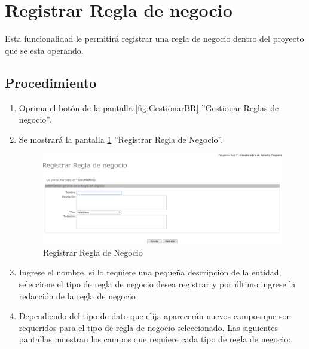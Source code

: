 
\hypertarget{cv:registrarBR}{\section{Registrar Regla de negocio}} \label{sec:registrarBR}

	Esta funcionalidad le permitirá registrar una regla de negocio dentro del proyecto que se esta operando. 

		\subsection{Procedimiento}

			\begin{enumerate}
	
			\item Oprima el botón \IURegistrar{} de la pantalla \ref{fig:GestionarBR} ''Gestionar Reglas de negocio''.
			
			\item Se mostrará la pantalla \ref{fig:registrarBR} ''Registrar Regla de Negocio''.

			\begin{figure}[H]
				\begin{center}
					\includegraphics[scale=0.5]{roles/lider/reglasNegocio/pantallas/IU8-1registrarBR}
					\caption{Registrar Regla de Negocio}
					\label{fig:registrarBR}
				\end{center}
			\end{figure}
		
			\item Ingrese el nombre, si lo requiere una pequeña descripción de la entidad, seleccione el tipo de regla de negocio desea registrar y por último ingrese la redacción de la regla de negocio
			
			\item Dependiendo del tipo de dato que elija aparecerán nuevos campos que son requeridos para el tipo de regla de negocio seleccionado. Las siguientes pantallas muestran los campos que requiere cada tipo de regla de negocio: 
			

\end{enumerate}
